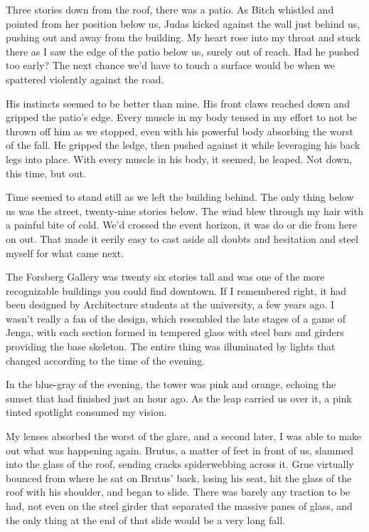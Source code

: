 Three stories down from the roof, there was a patio.  As Bitch whistled and pointed from her position below us, Judas kicked against the wall just behind us, pushing out and away from the building.  My heart rose into my throat and stuck there as I saw the edge of the patio below us, surely out of reach.  Had he pushed too early?  The next chance we'd have to touch a surface would be when we spattered violently against the road.



His instincts seemed to be better than mine.  His front claws reached down and gripped the patio's edge.  Every muscle in my body tensed in my effort to not be thrown off him as we stopped, even with his powerful body absorbing the worst of the fall.  He gripped the ledge, then pushed against it while leveraging his back legs into place.  With every muscle in his body, it seemed, he leaped.  Not down, this time, but out.



Time seemed to stand still as we left the building behind.  The only thing below us was the street, twenty-nine stories below. The wind blew through my hair with a painful bite of cold. We'd crossed the event horizon, it was do or die from here on out.  That made it eerily easy to cast aside all doubts and hesitation and steel myself for what came next.



The Forsberg Gallery was twenty six stories tall and was one of the more recognizable buildings you could find downtown.  If I remembered right, it had been designed by Architecture students at the university, a few years ago.  I wasn't really a fan of the design, which resembled the late stages of a game of Jenga, with each section formed in tempered glass with steel bars and girders providing the base skeleton.  The entire thing was illuminated by lights that changed according to the time of the evening.



In the blue-gray of the evening, the tower was pink and orange, echoing the sunset that had finished just an hour ago.  As the leap carried us over it, a pink tinted spotlight consumed my vision.



My lenses absorbed the worst of the glare, and a second later, I was able to make out what was happening again.  Brutus, a matter of feet in front of us, slammed into the glass of the roof, sending cracks spiderwebbing across it.  Grue virtually bounced from where he sat on Brutus' back, losing his seat, hit the glass of the roof with his shoulder, and began to slide.  There was barely any traction to be had, not even on the steel girder that separated the massive panes of glass, and the only thing at the end of that slide would be a very long fall.



